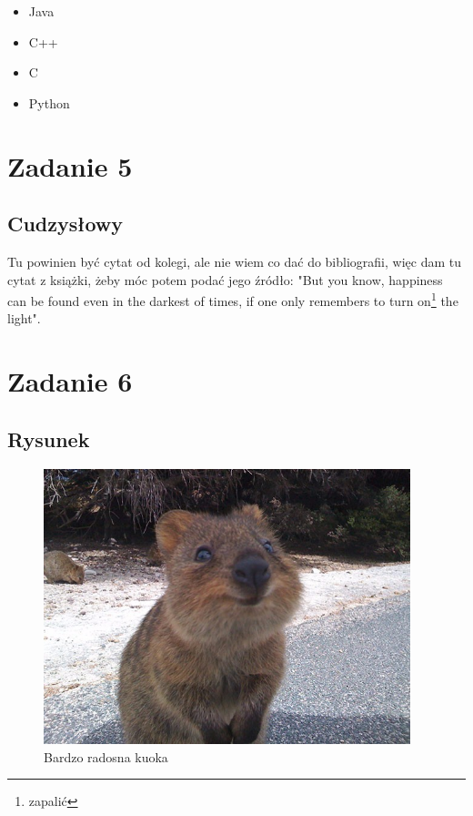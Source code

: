 \documentclass{article}
\begin{document}
\begin{itemize}
	\item Java
	\item C++
	\item C
	\item Python
\end{itemize}

\vspace{1cm}
\section{Zadanie 5}
\vspace{0,3cm}
\subsection{Cudzysłowy}
\vspace{0,5cm}
Tu powinien być cytat od kolegi, ale nie wiem co dać do bibliografii, więc dam tu cytat z książki, żeby móc potem podać jego źródło: "But you know, happiness can be found even in the darkest of times, if one only remembers to turn on\footnote{zapalić} the light". \cite{cyt}




\newpage
\section{Zadanie 6}
\vspace{0,3cm}
\subsection{Rysunek}

\begin{figure}[h]                %
	\centering
	\includegraphics[height=8cm]{kuoka.jpg}
	\caption{Bardzo radosna kuoka}
	\label{kuoka}
\end{figure}
\end{document}
